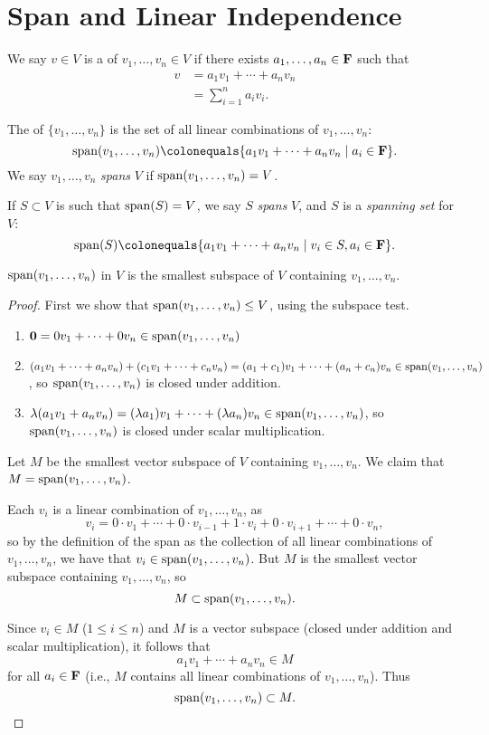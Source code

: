 \section{Span and Linear Independence}
\begin{definition}
We say $v\in V$ is a  of $v_1,\dots,v_n\in V$ if there exists $a_1,\dots,a_n\in\mathbf F$ such that
\begin{align*}
v&=a_1v_1+\cdots+a_nv_n\\
&=\sum_{i=1}^{n}a_iv_i.
\end{align*}
\end{definition}

\begin{definition}[Span]
The  of $\{v_1,\dots,v_n\}$ is the set of all linear combinations of $v_1,\dots,v_n$:
\[\spn(v_1,\dots,v_n)\colonequals\{a_1v_1+\cdots+a_nv_n\mid a_i\in\FF\}.\]
We say $v_1,\dots,v_n$ \emph{spans} $V$ if $\operatorname{span}(v_1,\dots,v_n)=V$.

If $S\subset V$ is such that $\operatorname{span}(S)=V$, we say $S$ \emph{spans} $V$, and $S$ is a \emph{spanning set} for $V$:
\[\spn(S)\colonequals\{a_1v_1+\cdots+a_nv_n\mid v_i\in S, a_i\in\FF\}.\]
\end{definition}

\begin{proposition}
$\operatorname{span}(v_1,\dots,v_n)$ in $V$ is the smallest subspace of $V$ containing $v_1,\dots,v_n$.
\end{proposition}

\begin{proof}
First we show that $\operatorname{span}(v_1,\dots,v_n)\le V$, using the subspace test.
\begin{enumerate}[label=(\roman*)]
\item $\vb{0}=0v_1+\cdots+0v_n\in\operatorname{span}(v_1,\dots,v_n)$
\item $(a_1v_1+\cdots+a_nv_n)+(c_1v_1+\cdots+c_nv_n)=(a_1+c_1)v_1+\cdots+(a_n+c_n)v_n\in\operatorname{span}(v_1,\dots,v_n)$, so $\operatorname{span}(v_1,\dots,v_n)$ is closed under addition.
\item $\lambda(a_1v_1+a_nv_n)=(\lambda a_1)v_1+\cdots+(\lambda a_n)v_n\in\operatorname{span}(v_1,\dots,v_n)$, so $\operatorname{span}(v_1,\dots,v_n)$ is closed under scalar multiplication.
\end{enumerate}

Let $M$ be the smallest vector subspace of $V$ containing $v_1,\dots,v_n$. We claim that $M=\operatorname{span}(v_1,\dots,v_n)$.

\fbox{$\subset$} Each $v_i$ is a linear combination of $v_1,\dots,v_n$, as
\[v_i=0\cdot v_1+\cdots+0\cdot v_{i-1}+1\cdot v_i+0\cdot v_{i+1}+\cdots+0\cdot v_n,\]
so by the definition of the span as the collection of all linear combinations of $v_1,\dots,v_n$, we have that $v_i\in\operatorname{span}(v_1,\dots,v_n)$. But $M$ is the smallest vector subspace containing $v_1,\dots,v_n$, so
\[M\subset\operatorname{span}(v_1,\dots,v_n).\]

\fbox{$\supset$} Since $v_i\in M$ ($1\le i\le n$) and $M$ is a vector subspace (closed under addition and scalar multiplication), it follows that
\[a_1v_1+\cdots+a_nv_n\in M\]
for all $a_i\in\mathbf F$ (i.e., $M$ contains all linear combinations of $v_1,\dots,v_n$). Thus
\[\operatorname{span}(v_1,\dots,v_n)\subset M.\]
\end{proof}

